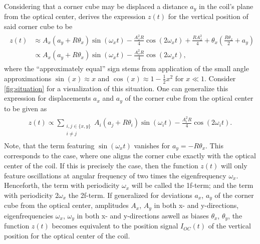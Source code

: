\documentclass{report}
\numberwithin{tm}{section}
\begin{document}
Considering that a corner cube may be displaced a distance $a_y$ in the coil's plane from the optical center, \cite[p.9]{Glardon.2024} derives the expression $z(t)$ for the vertical position of said corner cube to be 
\begin{align}\label{eq:verticalpos}
	\begin{aligned}
		z(t) &\approx A_x(a_y + R \theta_x)\sin(\omega_x t) - \frac{A_x^2 R}{4}\cos(2\omega_x t) + \frac{RA_x^2}{4} + \theta_x\left(\frac{R\theta_x}{2}+ a_y\right)  \\ &\propto A_x(a_y + R \theta_x)\sin(\omega_x t) - \frac{A_x^2 R}{4}\cos(2\omega_x t), 
	\end{aligned}
\end{align} 
where the ``approximately equal'' sign stems from application of the small angle approximations $\sin(x) \approx x$ and $\cos(x) \approx 1 - \frac{1}{2}x^2$ for $x \ll 1$. Consider \cref{fig:situation} for a visualization of this situation. One can generalize this expression for displacements $a_x$ and $a_y$ of the corner cube from the optical center to be given as \begin{align}\begin{aligned}
		z(t) \propto \sum_{\substack{i,j \in \{x,y\} \\ i \neq j} }A_i(a_j + R\theta_i)\sin(\omega_i t) - \frac{A_i^2 R}{4}\cos(2\omega_i t).
\end{aligned}\end{align} Note, that the term featuring $\sin(\omega_xt)$ vanishes for $a_y = -R\theta_x$. This corresponds to the case, where one aligns the corner cube exactly with the optical center of the coil. If this is precisely the case, then the function $z(t)$ will only feature oscillations at angular frequency of two times the eigenfrequency $\omega_x$. Henceforth, the term with periodicity $\omega_x$ will be called the 1f-term; and the term with periodicity $2\omega_x$ the 2f-term. If generalized for deviations $a_x$, $a_y$ of the corner cube from the optical center, amplitudes $A_x$, $A_y$ in both x- and y-directions, eigenfrequencies $\omega_x$, $\omega_y$ in both x- and y-directions aswell as biases $\theta_x$, $\theta_y$, the function $z(t)$ becomes equivalent to the position signal $I_{OC}(t)$ of the vertical position for the optical center of the coil.
\end{document}
